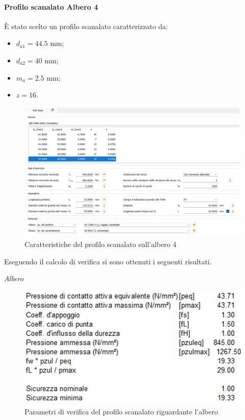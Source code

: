 \paragraph{Profilo scanalato Albero 4}

È stato scelto un profilo scanalato caratterizzato da:
\begin{itemize}
    \item $d_{a1}=44.5$ mm;
    \item $d_{a2}=40$ mm;
    \item $m_a=2.5$ mm;
    \item $z=16$.
\end{itemize}
\newpage
\begin{figure}[h]
    \centering
    \includegraphics[scale=0.5]{Immagini/Scanalato4.png}
    \caption{Caratteristiche del profilo scanalato sull'albero 4}
    \label{fig:Scanalato4}
\end{figure}

Eseguendo il calcolo di verifica si sono ottenuti i seguenti risultati.

\emph{Albero}
\begin{figure}[h]
    \centering
    \includegraphics[scale=0.5]{Immagini/RisultatiScanalatoAlbero4.png}
    \caption{Parametri  di verifica del profilo scanalato riguardante l'albero}
    \label{fig:RisultatiScanalatoAlbero4}
\end{figure}

